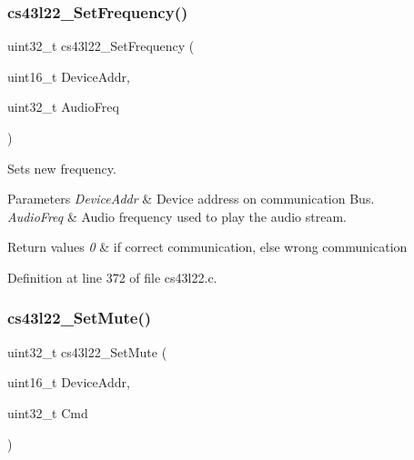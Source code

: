 \subsubsection{\texorpdfstring{cs43l22\+\_\+\+Set\+Frequency()}{cs43l22\_SetFrequency()}}
{\footnotesize\ttfamily uint32\+\_\+t cs43l22\+\_\+\+Set\+Frequency (\begin{DoxyParamCaption}\item[{uint16\+\_\+t}]{Device\+Addr,  }\item[{uint32\+\_\+t}]{Audio\+Freq }\end{DoxyParamCaption})}



Sets new frequency. 


\begin{DoxyParams}{Parameters}
{\em Device\+Addr} & Device address on communication Bus. ~\newline
\\
\hline
{\em Audio\+Freq} & Audio frequency used to play the audio stream. \\
\hline
\end{DoxyParams}

\begin{DoxyRetVals}{Return values}
{\em 0} & if correct communication, else wrong communication \\
\hline
\end{DoxyRetVals}


Definition at line 372 of file cs43l22.\+c.

\mbox{\label{group___c_s43_l22___private___functions_gaed17c2b64d79830afa43b5a45b159286}} 
\subsubsection{\texorpdfstring{cs43l22\+\_\+\+Set\+Mute()}{cs43l22\_SetMute()}}
{\footnotesize\ttfamily uint32\+\_\+t cs43l22\+\_\+\+Set\+Mute (\begin{DoxyParamCaption}\item[{uint16\+\_\+t}]{Device\+Addr,  }\item[{uint32\+\_\+t}]{Cmd }\end{DoxyParamCaption})}



